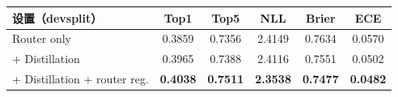 \begin{tabular}{lccccc}
\toprule
设置（devsplit） & Top1 & Top5 & NLL & Brier & ECE \\
\midrule
Router only & 0.3859 & 0.7356 & 2.4149 & 0.7634 & 0.0570 \\
+ Distillation & 0.3965 & 0.7388 & 2.4116 & 0.7551 & 0.0502 \\
+ Distillation + router reg. & \textbf{0.4038} & \textbf{0.7511} & \textbf{2.3538} & \textbf{0.7477} & \textbf{0.0482} \\
\bottomrule
\end{tabular}
